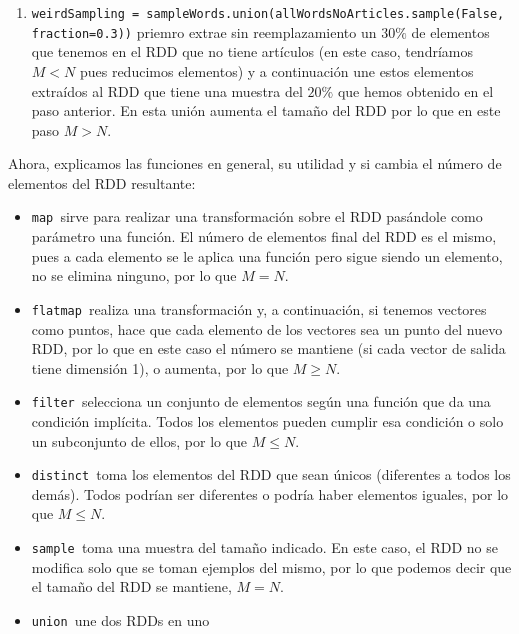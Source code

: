 \documentclass[11pt]{article}
\def\inline{\lstinline[basicstyle=\ttfamily,keywordstyle={}]}
\begin{document}
{{\begin{enumerate}
\item  \inline{weirdSampling = sampleWords.union(allWordsNoArticles.sample(False, fraction=0.3))} priemro extrae sin reemplazamiento un $30\%$ de elementos que tenemos en el RDD que no tiene artículos (en este caso, tendríamos $M < N$ pues reducimos elementos) y a continuación une estos elementos extraídos al RDD que tiene una muestra del $20\%$ que hemos obtenido en el paso anterior. En esta unión aumenta el tamaño del RDD por lo que en este paso $M > N$.

\end{enumerate}
Ahora, explicamos las funciones en general, su utilidad y si cambia el número de elementos del RDD resultante:

\begin{itemize}

\item  \inline{map }sirve para realizar una transformación sobre el RDD pasándole como parámetro una función. El número de elementos final del RDD es el mismo, pues a cada elemento se le aplica una función pero sigue siendo un elemento, no se elimina ninguno, por lo que $M=N$.

\item  \inline{flatmap }realiza una transformación y, a continuación, si tenemos vectores como puntos, hace que cada elemento de los vectores sea un punto del nuevo RDD, por lo que en este caso el número se mantiene (si cada vector de salida tiene dimensión 1), o aumenta, por lo que $M \geq N$.

\item  \inline{filter }selecciona un conjunto de elementos según una función que da una condición implícita. Todos los elementos pueden cumplir esa condición o solo un subconjunto de ellos, por lo que $M \leq N$.

\item  \inline{distinct }toma los elementos del RDD que sean únicos (diferentes a todos los demás). Todos podrían ser diferentes o podría haber elementos iguales, por lo que $M \leq N$.

\item  \inline{sample }toma una muestra del tamaño indicado. En este caso, el RDD no se modifica solo que se toman ejemplos del mismo, por lo que podemos decir que el tamaño del RDD se mantiene, $M=N$.

\item  \inline{union }une dos RDDs en uno

\end{itemize}

}}
\end{document}
